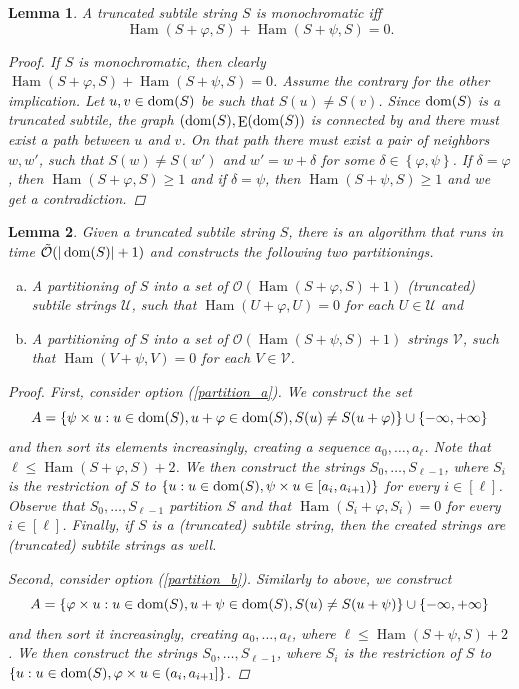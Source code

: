 \documentclass[11pt, letterpaper]{article}
\theoremstyle{plain}
\newtheorem{lemma}{Lemma}
\theoremstyle{definition}
\theoremstyle{remark}
\renewcommand{\O}{\mathcal{O}}
\newcommand{\tO}{\tilde{\mathcal{O}}}
\newcommand{\U}{\mathcal{U}}
\newcommand{\V}{\mathcal{V}}
\renewcommand{\phi}{\varphi}
\newcommand{\set}[1]{\left\lbrace #1 \right\rbrace}
\DeclareMathOperator*{\Edges}{E}
\DeclareMathOperator*{\Ham}{Ham}
\begin{document}
\begin{lemma}\label{monochromacy_condition}
	A truncated subtile string $S$ is monochromatic iff
	\[\Ham(S + \phi, S) + \Ham(S + \psi, S) = 0.\]
	\begin{proof}
		If $S$ is monochromatic, then clearly $\Ham(S + \phi, S) + \Ham(S + \psi, S) = 0$.
		Assume the contrary for the other implication.
		Let $u, v \in \operatorname*{dom}(S)$ be such that $S(u) \neq S(v)$.
		Since $\operatorname*{dom}(S)$ is a truncated subtile, the graph $(\d{S}, \Edges(\d{S})$ is connected by  and there must exist a path between $u$ and $v$.
		On that path there must exist a pair of neighbors $w, w'$, such that $S(w) \neq S(w')$ and $w' = w + \delta$ for some $\delta \in \set{\phi, \psi}$.
		If $\delta = \phi$, then $\Ham(S + \phi, S) \ge 1$ and if $\delta = \psi$, then $\Ham(S + \psi, S) \ge 1$ and we get a contradiction.
	\end{proof}
\end{lemma}


\begin{lemma}\label{cut_partitioning}
Given a truncated subtile string $S$, there is an algorithm that runs in time $\tO(|\d{S}| + 1)$ and constructs the following two partitionings.
	\begin{enumerate}[(a)]
		\item A partitioning of $S$ into a set of $\O(\Ham(S + \phi, S) + 1)$ (truncated) subtile strings $\U$, such that $\Ham(U + \phi, U) = 0$ for each $U \in \U$ and \label{partition_a}
		\item A partitioning of $S$ into a set of $\O(\Ham(S + \psi, S) + 1)$ strings $\V$, such that $\Ham(V + \psi, V) = 0$ for each $V \in \V$. \label{partition_b}
	\end{enumerate}
	\begin{proof}
		First, consider option (\ref{partition_a}). We construct the set
		\[ A = \set{\s{u} : u \in \d{S}, u + \phi \in \d{S}, S(u) \neq S(u + \phi)} \cup \set{-\infty, +\infty}\]
		and then sort its elements increasingly, creating a sequence $a_0, \dots, a_\ell$.
		Note that $\ell \le \Ham(S + \phi, S) + 2$.
		We then construct the strings $S_0, \dots, S_{\ell - 1}$, where $S_i$ is the restriction of $S$ to
		$\set{u : u \in \d{S}, \s{u} \in [a_i, a_{i + 1})}$ for every $i \in [\ell]$.
		Observe that $S_0, \dots, S_{\ell - 1}$ partition $S$ and that $\Ham(S_i + \phi, S_i) = 0$ for every $i \in [\ell]$. Finally, if $S$ is a (truncated) subtile string, then the created strings are (truncated) subtile strings as well.
	
		Second, consider option (\ref{partition_b}). Similarly to above, we construct
		\[ A = \set{\h{u} : u \in \d{S}, u + \psi \in \d{S}, S(u) \neq S(u + \psi)} \cup \set{-\infty, +\infty} \]
		and then sort it increasingly, creating $a_0, \dots, a_\ell$, where $\ell \le \Ham(S + \psi, S) + 2$.
		We then construct the strings $S_0, \dots, S_{\ell - 1}$, where $S_i$ is the restriction of $S$ to 
		$\set{u : u \in \d{S}, \h{u} \in (a_i, a_{i + 1}]}$.
	\end{proof}
\end{lemma}
\end{document}
